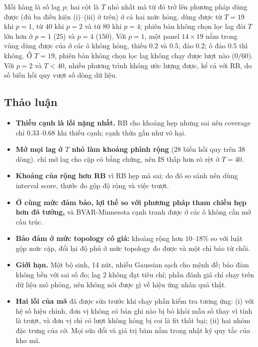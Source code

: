 Mỗi hàng là số lag $p$; hai cột là $T$ nhỏ nhất mà từ đó trở lên phương pháp dùng được (đủ ba điều kiện (i)--(iii) ở trên) ở cả hai mức hỏng. \ours{} dùng được từ $T=19$ khi $p=1$, từ $40$ khi $p=2$ và từ $80$ khi $p=4$; phiên bản không chọn lọc lag đòi $T$ lớn hơn ở $p=1$ ($25$) và $p=4$ ($150$).
Với $p=1$, một panel $14\times19$ nằm trong vùng dùng được của \ours{} ở các ô không hỏng, thiếu $0.2$ và $0.5$, đảo $0.2$; ô đảo $0.5$ thì không. Ở $T=19$, phiên bản không chọn lọc lag không chạy được lượt nào ($0/60$). Với $p=2$ và $T<40$, nhiều phương trình không ước lượng được, kể cả với RB, do số biến hồi quy vượt số dòng dữ liệu.

\subsection{Thảo luận}\label{sec:thao-luan}
\begin{itemize}
  \item \textbf{Thiếu cạnh là lỗi nặng nhất.} RB cho khoảng hẹp nhưng sai nên coverage chỉ $0.33$--$0.68$ khi thiếu cạnh; cạnh thừa gần như vô hại.
  \item \textbf{Mở mọi lag ở $T$ nhỏ làm khoảng phình rộng} ($28$ biến hồi quy trên $38$ dòng). \ours{} chỉ mở lag cho cặp có bằng chứng, nên IS thấp hơn rõ rệt ở $T=40$.
  \item \textbf{Khoảng của \ours{} rộng hơn RB} vì RB hẹp mà sai; do đó so sánh nên dùng interval score, thước đo gộp độ rộng và việc trượt.
  \item \textbf{Ở cùng mức đảm bảo, lợi thế so với phương pháp tham chiếu hẹp hơn đã tưởng,} và BVAR-Minnesota cạnh tranh được ở các ô không cần mở cấu trúc.
  \item \textbf{Bảo đảm ở mức topology có giá:} khoảng rộng hơn $10$--$18\%$ so với luật gộp mức cặp, đổi lại độ phủ ở mức topology đo được và một chỉ báo từ chối.
  \item \textbf{Giới hạn.} Một bộ sinh, 14 nút, nhiễu Gaussian sạch cho mệnh đề; bảo đảm không bền với sai số đo; lag 2 không đạt tiêu chí; phần đánh giá chỉ chạy trên dữ liệu mô phỏng, nên không nói được gì về hiệu ứng nhân quả thật.
  \item \textbf{Hai lỗi của mã} đã được sửa trước khi chạy phần kiểm tra tương ứng: (i) với hệ số hiệu chỉnh, đơn vị không có bản ghi nào bị bỏ khỏi mẫu số thay vì tính là trượt, và đơn vị chỉ có lượt không hỏng bị coi là fit thất bại; (ii) hai nhóm đặc trưng của cờ. Mọi sửa đổi và giá trị băm nằm trong nhật ký quy tắc của kho mã.
\end{itemize}
